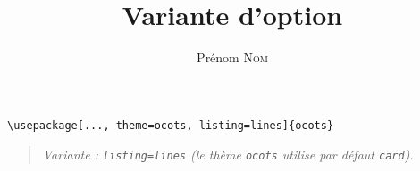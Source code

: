 \documentclass[11pt]{ocots-book}
\title{Variante d'option}
\author{Prénom \textsc{Nom}}
\newcommand{\ocotsvariantnote}[1]{\begin{quote}\itshape Variante : #1\end{quote}}
\begin{document}
\maketitle

\begin{lstlisting}
\usepackage[..., theme=ocots, listing=lines]{ocots}
\end{lstlisting}
\ocotsvariantnote{\texttt{listing=lines} (le th\`eme \texttt{ocots} utilise par d\'efaut \texttt{card}).}

\end{document}
